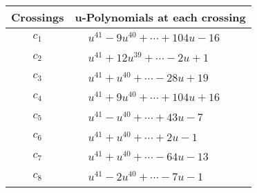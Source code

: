 \documentclass[1p]{elsarticle_modified}
\theoremstyle{definition}
\begin{document}
\begin{tabular}{m{50pt}|m{274pt}}
Crossings & \hspace{64pt}u-Polynomials at each crossing \\
\hline $$\begin{aligned}c_{1}\end{aligned}$$&$\begin{aligned}
&u^{41}-9 u^{40}+\cdots+104 u-16
\end{aligned}$\\
\hline $$\begin{aligned}c_{2}\end{aligned}$$&$\begin{aligned}
&u^{41}+12 u^{39}+\cdots-2 u+1
\end{aligned}$\\
\hline $$\begin{aligned}c_{3}\end{aligned}$$&$\begin{aligned}
&u^{41}+u^{40}+\cdots-28 u+19
\end{aligned}$\\
\hline $$\begin{aligned}c_{4}\end{aligned}$$&$\begin{aligned}
&u^{41}+9 u^{40}+\cdots+104 u+16
\end{aligned}$\\
\hline $$\begin{aligned}c_{5}\end{aligned}$$&$\begin{aligned}
&u^{41}- u^{40}+\cdots+43 u-7
\end{aligned}$\\
\hline $$\begin{aligned}c_{6}\end{aligned}$$&$\begin{aligned}
&u^{41}+u^{40}+\cdots+2 u-1
\end{aligned}$\\
\hline $$\begin{aligned}c_{7}\end{aligned}$$&$\begin{aligned}
&u^{41}+u^{40}+\cdots-64 u-13
\end{aligned}$\\
\hline $$\begin{aligned}c_{8}\end{aligned}$$&$\begin{aligned}
&u^{41}-2 u^{40}+\cdots-7 u-1
\end{aligned}$\\

\end{tabular}
\end{document}
